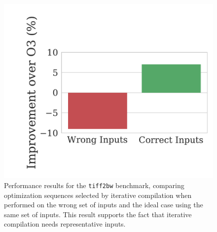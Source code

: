 \begin{figure}[ht]
    \centering
    \includegraphics[width=0.7\linewidth]{figs/motivation_wrong_inputs.pdf}
    \caption{Performance results for the \texttt{tiff2bw} benchmark, comparing optimization sequences selected by iterative compilation when performed on the wrong set of inputs and the ideal case using the same set of inputs.
    This result supports the fact that iterative compilation needs representative inputs.}
    \label{fig:motivation_wrong_inputs}
\end{figure}


